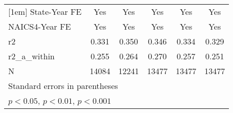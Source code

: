 {\begin{tabular}{l*{5}{c}}
[1em]
State-Year FE&         Yes         &         Yes         &         Yes         &         Yes         &         Yes         \\
[1em]
NAICS4-Year FE&         Yes         &         Yes         &         Yes         &         Yes         &         Yes         \\
\hline
r2          &       0.331         &       0.350         &       0.346         &       0.334         &       0.329         \\
r2\_a\_within &       0.255         &       0.264         &       0.270         &       0.257         &       0.251         \\
N           &       14084         &       12241         &       13477         &       13477         &       13477         \\
\hline\hline
\multicolumn{6}{l}{\footnotesize Standard errors in parentheses}\\
\multicolumn{6}{l}{\footnotesize \sym{*} \(p<0.05\), \sym{**} \(p<0.01\), \sym{***} \(p<0.001\)}\\
\end{tabular}
}
